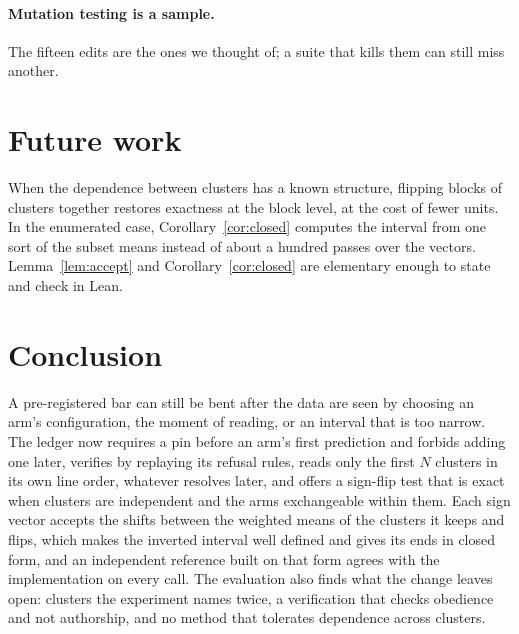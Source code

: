 \documentclass[11pt]{article}
\theoremstyle{plain}
\theoremstyle{definition}
\theoremstyle{remark}
\begin{document}
\paragraph{Mutation testing is a sample.} The fifteen edits are the ones we thought of; a suite
that kills them can still miss another.

\section{Future work}\label{sec:future}
When the dependence between clusters has a known structure,
flipping blocks of clusters together restores exactness at the block level, at the cost of fewer
units. In the enumerated case, Corollary~\ref{cor:closed} computes the interval from one sort of
the subset means instead of about a hundred passes over the vectors.
Lemma~\ref{lem:accept} and Corollary~\ref{cor:closed} are elementary enough to state and check in
Lean.

\section{Conclusion}
A pre-registered bar can still be bent after the data are seen by choosing an arm's configuration,
the moment of reading, or an interval that is too narrow. The ledger now requires a pin before an
arm's first prediction and forbids adding one later, verifies by replaying its refusal rules, reads
only the first $N$ clusters in its own line order, whatever resolves later, and offers a sign-flip test that is exact when clusters are independent and the arms
exchangeable within them. Each sign vector accepts the shifts between the weighted means of the
clusters it keeps and flips, which makes the inverted interval well defined and gives its ends in
closed form, and an independent reference built on that form agrees with the implementation on
every call. The evaluation also finds what the change leaves open: clusters the experiment names
twice, a verification that checks obedience and not authorship, and no method that
tolerates dependence across clusters.



\end{document}
